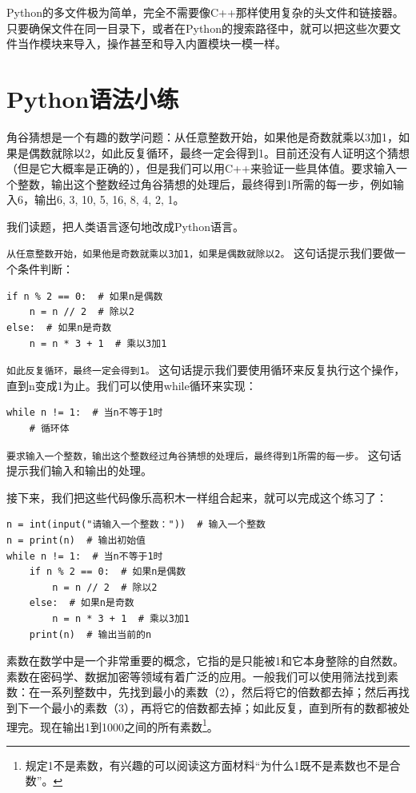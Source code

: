 Python的多文件极为简单，完全不需要像C++那样使用复杂的头文件和链接器。只要确保文件在同一目录下，或者在Python的搜索路径中，就可以把这些次要文件当作模块来导入，操作甚至和导入内置模块一模一样。

\section{Python语法小练}

\begin{example}
  角谷猜想是一个有趣的数学问题：从任意整数开始，如果他是奇数就乘以3加1，如果是偶数就除以2，如此反复循环，最终一定会得到1。目前还没有人证明这个猜想（但是它大概率是正确的），但是我们可以用C++来验证一些具体值。要求输入一个整数，输出这个整数经过角谷猜想的处理后，最终得到1所需的每一步，例如输入6，输出6, 3, 10, 5, 16, 8, 4, 2, 1。
\end{example}

\begin{answer}
  我们读题，把人类语言逐句地改成Python语言。

   \texttt{从任意整数开始，如果他是奇数就乘以3加1，如果是偶数就除以2。} 这句话提示我们要做一个条件判断：
\begin{verbatim}
if n % 2 == 0:  # 如果n是偶数
    n = n // 2  # 除以2
else:  # 如果n是奇数
    n = n * 3 + 1  # 乘以3加1
\end{verbatim}
   \texttt{如此反复循环，最终一定会得到1。} 这句话提示我们要使用循环来反复执行这个操作，直到n变成1为止。我们可以使用while循环来实现：
\begin{verbatim}
while n != 1:  # 当n不等于1时
    # 循环体
\end{verbatim}

   \texttt{要求输入一个整数，输出这个整数经过角谷猜想的处理后，最终得到1所需的每一步。} 这句话提示我们输入和输出的处理。

  接下来，我们把这些代码像乐高积木一样组合起来，就可以完成这个练习了：
\begin{verbatim}
n = int(input("请输入一个整数："))  # 输入一个整数
n = print(n)  # 输出初始值
while n != 1:  # 当n不等于1时
    if n % 2 == 0:  # 如果n是偶数
        n = n // 2  # 除以2
    else:  # 如果n是奇数
        n = n * 3 + 1  # 乘以3加1
    print(n)  # 输出当前的n
\end{verbatim}
\end{answer}

\begin{example}
  素数在数学中是一个非常重要的概念，它指的是只能被1和它本身整除的自然数。素数在密码学、数据加密等领域有着广泛的应用。一般我们可以使用筛法找到素数：在一系列整数中，先找到最小的素数（2），然后将它的倍数都去掉；然后再找到下一个最小的素数（3），再将它的倍数都去掉；如此反复，直到所有的数都被处理完。现在输出1到1000之间的所有素数\footnote{规定1不是素数，有兴趣的可以阅读这方面材料“为什么1既不是素数也不是合数”。}。
\end{example}

